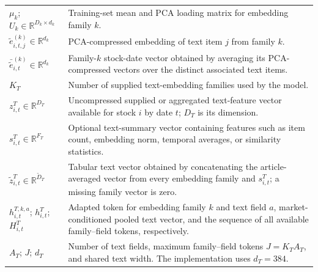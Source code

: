\documentclass[11pt]{article}
\newcommand{\R}{\mathbb{R}}
\begin{document}
{\begin{longtable}{@{}p{}p{}@{}}
$\mu_k$; $U_k\in\R^{D_k\times d_k}$ & Training-set mean and PCA loading matrix for embedding family $k$. \\
$\widetilde e^{(k)}_{i,t,j}\in\R^{d_k}$ & PCA-compressed embedding of text item $j$ from family $k$. \\
$\bar{\widetilde e}^{(k)}_{i,t}\in\R^{d_k}$ & Family-$k$ stock-date vector obtained by averaging its PCA-compressed vectors over the distinct associated text items. \\
$K_T$ & Number of supplied text-embedding families used by the model. \\
$z^T_{i,t}\in\R^{D_T}$ & Uncompressed supplied or aggregated text-feature vector available for stock $i$ by date $t$; $D_T$ is its dimension. \\
$s^T_{i,t}\in\R^{F_T}$ & Optional text-summary vector containing features such as item count, embedding norm, temporal averages, or similarity statistics. \\
$\widetilde z^T_{i,t}\in\R^{\widetilde D_T}$ & Tabular text vector obtained by concatenating the article-averaged vector from every embedding family and $s^T_{i,t}$; a missing family vector is zero. \\
$h^{T,k,a}_{i,t}$; $h^T_{i,t}$; $H^T_{i,t}$ & Adapted token for embedding family $k$ and text field $a$, market-conditioned pooled text vector, and the sequence of all available family--field tokens, respectively. \\
$A_T$; $J$; $d_T$ & Number of text fields, maximum family--field tokens $J=K_TA_T$, and shared text width. The implementation uses $d_T=384$. \\
\bottomrule
\end{longtable}

}
\end{document}
